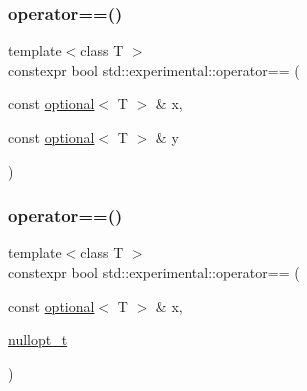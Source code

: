 \subsubsection{\texorpdfstring{operator==()}{operator==()}\hspace{0.1cm}{\footnotesize\ttfamily [1/9]}}
{\footnotesize\ttfamily template$<$class T $>$ \\
constexpr bool std\+::experimental\+::operator== (\begin{DoxyParamCaption}\item[{const \mbox{\hyperlink{classstd_1_1experimental_1_1optional}{optional}}$<$ T $>$ \&}]{x,  }\item[{const \mbox{\hyperlink{classstd_1_1experimental_1_1optional}{optional}}$<$ T $>$ \&}]{y }\end{DoxyParamCaption})}

\mbox{\label{namespacestd_1_1experimental_a4f15144833bc5951b01fbd4b4bfdb6fb}} 
\subsubsection{\texorpdfstring{operator==()}{operator==()}\hspace{0.1cm}{\footnotesize\ttfamily [2/9]}}
{\footnotesize\ttfamily template$<$class T $>$ \\
constexpr bool std\+::experimental\+::operator== (\begin{DoxyParamCaption}\item[{const \mbox{\hyperlink{classstd_1_1experimental_1_1optional}{optional}}$<$ T $>$ \&}]{x,  }\item[{\mbox{\hyperlink{structstd_1_1experimental_1_1nullopt__t}{nullopt\+\_\+t}}}]{ }\end{DoxyParamCaption})\hspace{0.3cm}{\ttfamily [noexcept]}}

\mbox{\label{namespacestd_1_1experimental_a23a59ad403fb2809087806ff9037d42e}} 
